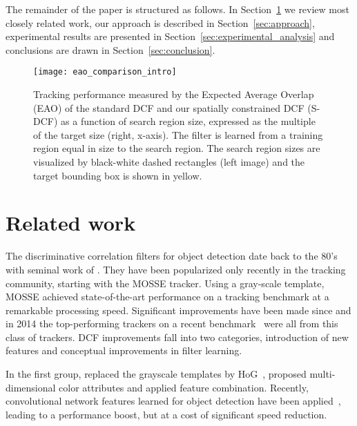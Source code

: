 \documentclass[twocolumn]{article}
\begin{document}
The remainder of the paper is structured as follows. In Section~\ref{sec:related_work} we review most closely related work, our approach is described in Section~\ref{sec:approach}, experimental results are presented in Section~\ref{sec:experimental_analysis} and conclusions are drawn in Section~\ref{sec:conclusion}.

\begin{figure}[!t]
\centering
\texttt{[image: eao\_comparison\_intro]}
\caption{Tracking performance measured by the Expected Average Overlap (EAO) of the standard DCF and our spatially constrained DCF (S-DCF) as 
a function of search region size, expressed as 
the multiple of the target size (right, x-axis). The filter is learned from a training region equal in size to the search region. The search region sizes are visualized by black-white dashed rectangles (left image) and the target bounding box is shown in yellow.}
\label{fig:eao_comparison_intro}
\end{figure}

\section{Related work}\label{sec:related_work}

The discriminative correlation filters for object detection date back to the 80's with seminal work of \cite{hester1980}. They have been popularized only recently in the tracking community, starting with the \cite{bolme2010visual} MOSSE tracker. Using a gray-scale template, MOSSE achi\-eved  state-of-the-art performance on a tracking benchmark \citep{otb_cvpr2010} at a remarkable processing speed. Significant improvements have been made since and in 2014 the top-performing trackers on a recent benchmark~\citep{kristan_vot2014} were all from this class of trackers.  DCF improvements fall into two categories,  introduction of new features and conceptual improvements in filter learning.

In the first group, \cite{henriques2015tracking} replaced the grayscale templates by HoG~\citep{dalal_triggs_hog}, \cite{danelljan2014adaptive} proposed multi-dimensional color attributes and \cite{Li2014} applied feature combination. Recently, convolutional network features learned for object detection have been applied~\citep{convolutional_mingsungyang_iccv2015, danelljan_iccv2015_convolutional, danelljan_eccv2016_ccot}, leading to a performance boost, but at a cost of significant speed reduction.
\end{document}
